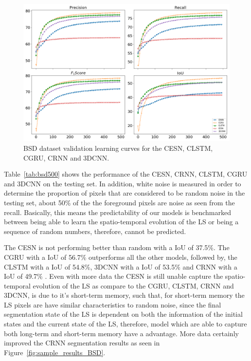 \documentclass{WitsPhysicsReport}
\begin{document}
\begin{figure}[H]
\centering
  \includegraphics[width=1\textwidth]{Figure/Results/BSR_performance.png}
\caption{BSD dataset validation learning curves for the CESN, CLSTM, CGRU, CRNN and 3DCNN.} \label{fig:BSD_model_perfomance}
\end{figure}


Table~\ref{tab:bsd500} shows the performance of the CESN, CRNN, CLSTM, CGRU and 3DCNN on the testing set. In addition, white noise is measured in order to determine the proportion of pixels that are considered to be random noise in the testing set, about 50\% of the the foreground pixels are noise as seen from the recall. Basically, this means the predictability of our models is benchmarked between being able to learn the spatio-temporal evolution of the LS or being a sequence of random numbers, therefore, cannot be predicted.  

The CESN is not performing better than random with a IoU of 37.5\%. The CGRU with a IoU of 56.7\% outperforms all the other models, followed by, the CLSTM with a IoU of 54.8\%, 3DCNN with a IoU of 53.5\% and CRNN with a IoU of 49.7\% . Even with more data the CESN is still unable capture the spatio-temporal evolution of the LS as compare to the CGRU, CLSTM, CRNN and 3DCNN, is due to it's short-term memory, such that, for short-term memory the LS pixels are have similar characteristics to random noise, since the final segmentation state of the LS is dependent on both the information of the initial states and the current state of the LS, therefore, model which are able to capture both long-term and short-term memory have a advantage. More data certainly improved the CRNN segmentation results as seen in  Figure~\ref{fig:sample_results_BSD}.
\end{document}
